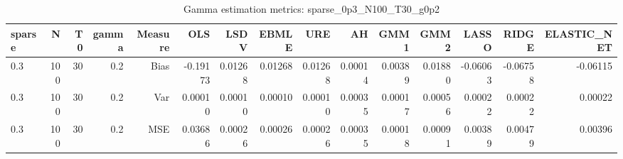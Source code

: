 \begin{table}[!htbp]\centering
\caption{Gamma estimation metrics: sparse_0p3_N100_T30_g0p2}
\label{tab:table1_sparse_0p3_N100_T30_g0p2}
\begin{tabular}{lrrrrrrrrrrrrrr}
\hline
sparse & N & T0 & gamma & Measure & OLS & LSDV & EBMLE & URE & AH & GMM1 & GMM2 & LASSO & RIDGE & ELASTIC_NET \\
\hline
0.3 & 100 & 30 & 0.2 & Bias & -0.19173 & 0.01268 & 0.01268 & 0.01268 & 0.00014 & 0.00389 & 0.01880 & -0.06063 & -0.06758 & -0.06115 \\
0.3 & 100 & 30 & 0.2 & Var & 0.00010 & 0.00010 & 0.00010 & 0.00010 & 0.00035 & 0.00017 & 0.00056 & 0.00022 & 0.00022 & 0.00022 \\
0.3 & 100 & 30 & 0.2 & MSE & 0.03686 & 0.00026 & 0.00026 & 0.00026 & 0.00035 & 0.00018 & 0.00091 & 0.00389 & 0.00479 & 0.00396 \\
\hline
\end{tabular}
\end{table}

